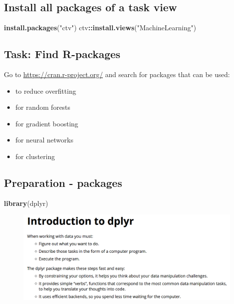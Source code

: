 \documentclass[10pt,]{article}
\newenvironment{Shaded}{\begin{snugshade}}{\end{snugshade}}
\newcommand{\KeywordTok}[1]{\textcolor[rgb]{0.13,0.29,0.53}{\textbf{#1}}}
\newcommand{\StringTok}[1]{\textcolor[rgb]{0.31,0.60,0.02}{#1}}
\newcommand{\OperatorTok}[1]{\textcolor[rgb]{0.81,0.36,0.00}{\textbf{#1}}}
\newcommand{\NormalTok}[1]{#1}
\providecommand{\tightlist}{%
  \setlength{\itemsep}{0pt}\setlength{\parskip}{0pt}}
\begin{document}
\subsection{Install all packages of a task
view}\label{install-all-packages-of-a-task-view}

\begin{Shaded}
\begin{Highlighting}[]
\KeywordTok{install.packages}\NormalTok{(}\StringTok{"ctv"}\NormalTok{)}
\NormalTok{ctv}\OperatorTok{::}\KeywordTok{install.views}\NormalTok{(}\StringTok{"MachineLearning"}\NormalTok{)}
\end{Highlighting}
\end{Shaded}

\subsection{Task: Find R-packages}\label{task-find-r-packages}

Go to \url{https://cran.r-project.org/} and search for packages that can
be used:

\begin{itemize}
\tightlist
\item
  to reduce overfitting
\item
  for random forests
\item
  for gradient boosting
\item
  for neural networks
\item
  for clustering
\end{itemize}

\subsection{Preparation - packages}\label{preparation---packages}

\begin{Shaded}
\begin{Highlighting}[]
\KeywordTok{library}\NormalTok{(dplyr)}
\end{Highlighting}
\end{Shaded}

\begin{figure}
\centering
\includegraphics{figure/dplyr_vignette.PNG}
\caption{}
\end{figure}
\end{document}
